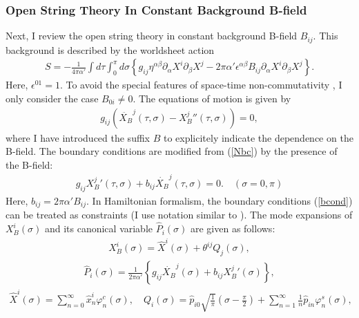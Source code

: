 \documentclass[a4paper,12pt]{article}
\newcommand{\pa}{\partial}
\newcommand{\co}{\varphi^c}
\newcommand{\si}{\varphi^s}
\newcommand{\XB}{X_B}
\begin{document}
\subsubsection*{Open String Theory In Constant %
Background B-field}

Next, I review the open string theory 
in constant background B-field $B_{ij}$.
This background is described by the worldsheet action
\begin{eqnarray}
 \label{BWS}
S=
-\frac{1}{4\pi\alpha'}
\int d\tau \int_0^{\pi} d\sigma
\left\{
g_{ij} \eta^{\alpha\beta} \pa_\alpha X^i \pa_\beta X^j
-
2\pi\alpha' \epsilon^{\alpha\beta}
B_{ij}\pa_\alpha X^i \pa_\beta X^j
\right\} .
\end{eqnarray}
Here,
$\epsilon^{01} = 1$.
To avoid the special features of space-time
non-commutativity \cite{SST},
I only consider the case $B_{0i}\ne0$.
The equations of motion is given by
\begin{eqnarray}
  \label{eqXB}
g_{ij}
\left(
\ddot{\XB}^j(\tau,\sigma)-{\XB^j}''(\tau,\sigma)
\right) = 0,
\end{eqnarray}
where I have introduced the suffix $B$ to 
explicitely 
indicate the dependence on the B-field.
The boundary conditions are modified from (\ref{Nbc}) by
the presence of the B-field:
\begin{eqnarray}
 \label{bcond}
g_{ij}{\XB^{j}}'(\tau,\sigma)+b_{ij}\dot{\XB}^j(\tau,\sigma) = 0.
\quad (\sigma = 0, \pi) 
\end{eqnarray}
Here,
$b_{ij} = 2\pi\alpha' B_{ij}$.
In Hamiltonian formalism,
the boundary conditions (\ref{bcond}) can be
treated as constraints \cite{ChuHo}
(I use notation similar to \cite{KT1}).
The mode expansions of $\XB^i(\sigma)$
and its canonical variable $\hat{P}_i(\sigma)$
are given as follows:
\begin{eqnarray}
 \label{XhX}
\XB^i(\sigma) = \hat{X}^{i}(\sigma) 
+ \theta^{ij} Q_j(\sigma),
\end{eqnarray}
%
\begin{eqnarray}
 \label{hP}
\hat{P}_i(\sigma)
=
\frac{1}{2\pi\alpha'}
\left\{
g_{ij} \dot{\XB}^j(\sigma) + b_{ij} {\XB^j}'(\sigma)
\right\}, 
\end{eqnarray}
%
\begin{eqnarray}
 \label{hXQ}
\hat{X}^i(\sigma)  =
\sum_{n=0}^{\infty} \hat{x}^i_n \co_n(\sigma),
\quad
Q_i(\sigma)  = 
\hat{p}_{i0} \sqrt{\frac{1}{\pi}}\left(\sigma - \frac{\pi}{2} \right) +
\sum_{n=1}^{\infty} \frac{1}{n} \hat{p}_{i n} \si_n(\sigma),
\end{eqnarray}
\end{document}
